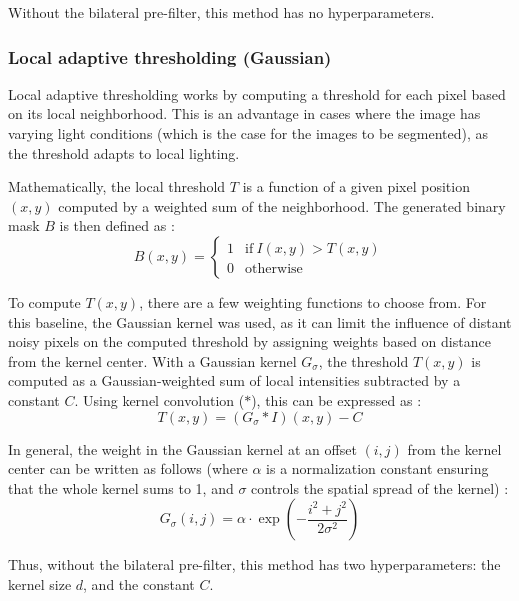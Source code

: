 \noindent Without the bilateral pre-filter, this method has no hyperparameters.
\subsubsection{Local adaptive thresholding (Gaussian)}
\label{subsubsec:gaussian_baseline}
Local adaptive thresholding works by computing a threshold for each pixel based on its local neighborhood.
This is an advantage in cases where the image has varying light conditions (which is the case for the images to be segmented), as the threshold adapts to local lighting.

Mathematically, the local threshold $T$ is a function of a given pixel position $(x,y)$ computed by a weighted sum of the neighborhood.
The generated binary mask $B$ is then defined as \parencite[p.~761]{DigitalImageProcessing}:
$$ B(x,y) = \begin{cases}
    1 & \text{if} ~ I(x,y) > T(x,y) \\
    0 & \text{otherwise} \end{cases} $$

To compute $T(x,y)$, there are a few weighting functions to choose from.
For this baseline, the Gaussian kernel was used, as it can limit the influence of distant noisy pixels on the computed threshold by assigning weights based on distance from the kernel center.
With a Gaussian kernel  $G_{\sigma}$, the threshold $T(x,y)$ is computed as a Gaussian-weighted sum of local intensities subtracted by a constant $C$. Using kernel convolution ($*$), this can be expressed as \parencite[see][]{opencv_adaptive_threshold}\parencite[p.~761]{DigitalImageProcessing}:
$$ T(x,y) = (G_{\sigma} * I)(x,y) - C $$

In general, the weight in the Gaussian kernel at an offset $(i,j)$ from the kernel center can be written as follows (where $\alpha$ is a normalization constant ensuring that the whole kernel sums to 1, and $\sigma$ controls the spatial spread of the kernel) \parencite[p.~167]{DigitalImageProcessing}:
$$ G_{\sigma}(i,j) = \alpha \cdot \exp\left(-\frac{i^2 + j^2}{2\sigma^2}\right) $$

\noindent Thus, without the bilateral pre-filter, this method has two hyperparameters: the kernel size $d$, and the constant $C$.

